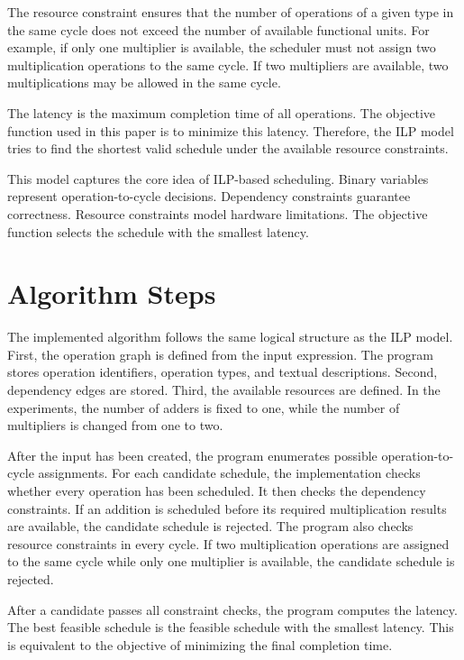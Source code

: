 \documentclass[conference]{IEEEtran}
\begin{document}
	The resource constraint ensures that the number of operations of a given type in the same cycle does not exceed the number of available functional units. For example, if only one multiplier is available, the scheduler must not assign two multiplication operations to the same cycle. If two multipliers are available, two multiplications may be allowed in the same cycle.
	
	The latency is the maximum completion time of all operations. The objective function used in this paper is to minimize this latency. Therefore, the ILP model tries to find the shortest valid schedule under the available resource constraints.
	
	This model captures the core idea of ILP-based scheduling. Binary variables represent operation-to-cycle decisions. Dependency constraints guarantee correctness. Resource constraints model hardware limitations. The objective function selects the schedule with the smallest latency.
	
	\section{Algorithm Steps}
	
	The implemented algorithm follows the same logical structure as the ILP model. First, the operation graph is defined from the input expression. The program stores operation identifiers, operation types, and textual descriptions. Second, dependency edges are stored. Third, the available resources are defined. In the experiments, the number of adders is fixed to one, while the number of multipliers is changed from one to two.
	
	After the input has been created, the program enumerates possible operation-to-cycle assignments. For each candidate schedule, the implementation checks whether every operation has been scheduled. It then checks the dependency constraints. If an addition is scheduled before its required multiplication results are available, the candidate schedule is rejected. The program also checks resource constraints in every cycle. If two multiplication operations are assigned to the same cycle while only one multiplier is available, the candidate schedule is rejected.
	
	After a candidate passes all constraint checks, the program computes the latency. The best feasible schedule is the feasible schedule with the smallest latency. This is equivalent to the objective of minimizing the final completion time.
	
\end{document}
